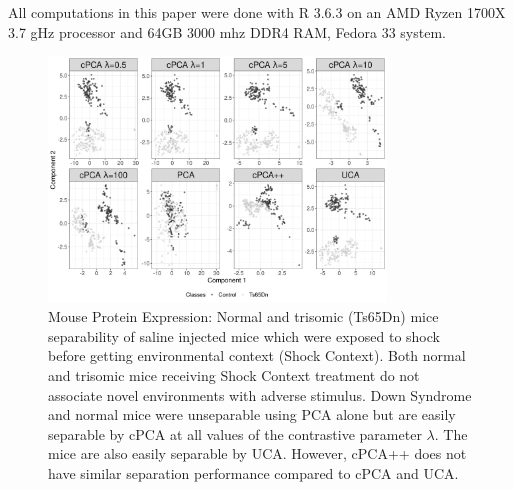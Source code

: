 \documentclass[10pt]{article}
\begin{document}

All computations in this paper were done with R 3.6.3 \cite{baseR} on an AMD Ryzen 1700X 3.7 gHz processor and 64GB 3000 mhz DDR4 RAM, Fedora 33 system. 


\begin{figure}[th!]
  \centering
  \includegraphics[width = 0.8\textwidth]{figure/Mouse_Data_bw.png}
  \caption{Mouse Protein Expression: Normal and trisomic (Ts65Dn) mice separability of saline injected mice which were exposed to shock before getting environmental context (Shock Context). Both normal and trisomic mice receiving Shock Context treatment do not associate novel environments with adverse stimulus. Down Syndrome and normal mice were unseparable using PCA alone but are easily separable by cPCA at all values of the contrastive parameter $\lambda$.  The mice are also easily separable by UCA.  However, cPCA++ does not have similar separation performance compared to cPCA and UCA.}
  \label{fig:Mouse}
\end{figure}
\end{document}
